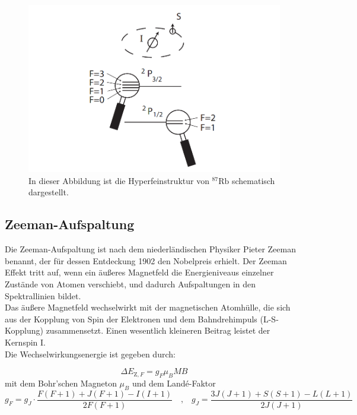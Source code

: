 \begin{figure}[H]
    \centering
    \includegraphics[scale=0.4]{figures/hyperfeinstruktur.png}
    \caption{In dieser Abbildung ist die Hyperfeinstruktur von $^{87}\text{Rb}$ schematisch dargestellt.\cite{pdf_anleitung}}
    \label{fig:hyper}
\end{figure}

\subsection{Zeeman-Aufspaltung}
Die Zeeman-Aufspaltung ist nach dem niederländischen Physiker Pieter Zeeman benannt, der für dessen Entdeckung 1902 den Nobelpreis erhielt.
Der Zeeman Effekt tritt auf, wenn ein äußeres Magnetfeld die Energieniveaus einzelner Zustände von Atomen verschiebt, und dadurch Aufspaltungen in den Spektrallinien bildet.\\
Das äußere Magnetfeld wechselwirkt mit der magnetischen Atomhülle, die sich aus der Kopplung von Spin der Elektronen und dem Bahndrehimpuls (L-S-Kopplung) zusammensetzt.
Einen wesentlich kleineren Beitrag leistet der Kernspin I.\\
Die Wechselwirkungsenergie ist gegeben durch:

\begin{equation}
    \Delta E_{\text{Z},F} = g_F \mu_B M B
    \label{eq:zeeman}
\end{equation}
mit dem Bohr'schen Magneton $\mu_B$ und dem Landé-Faktor
\begin{equation}
    g_F = g_J \cdot \frac{F(F+1) + J(F+1) - I(I+1)}{2F(F+1)}
    \quad \text{,} \quad
    g_J = \frac{3J(J+1) + S(S+1) - L(L+1)}{2J(J+1)}
    \label{eq:landefaktor}
\end{equation}

